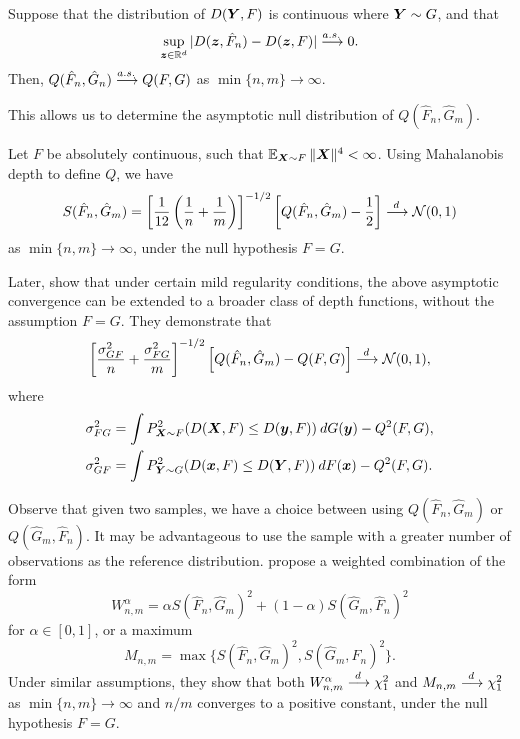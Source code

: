 \begin{theorem}
    Suppose that the distribution of $D(\bm{Y}, F)$ is continuous where $\bm{Y} \sim
    G$, and that
    \begin{equation}
        \sup_{\bm{z} \in \mathbb{R}^d} |D(\bm{z}, \hat{F}_n) - D(\bm{z}, F)| \overset{a.s.\,}{\longrightarrow} 0.
    \end{equation}
    Then, $Q(\hat{F}_n, \hat{G}_n) \overset{a.s.\,}{\longrightarrow} Q(F, G)$ as $\min\{n, m\} \to
    \infty$.
\end{theorem}

This allows us to determine the asymptotic null distribution of $Q(\hat{F}_n,
\hat{G}_m)$.

\begin{theorem}
    Let $F$ be absolutely continuous, such that $\operatorname{\mathbb{E}}_{\bm{X} \sim F} \Vert \bm{X} \Vert^4
    < \infty$.
    Using Mahalanobis depth to define $Q$, we have
    \begin{equation}
        S(\hat{F}_n, \hat{G}_m) = \left[\frac{1}{12}\left(\frac{1}{n} + \frac{1}{m}\right)\right]^{-1/2} \left[Q(\hat{F}_n, \hat{G}_m) - \frac{1}{2}\right] \overset{d\,}{\longrightarrow} \mathcal{N}(0, 1)
    \end{equation}
    as $\min\{n, m\} \to \infty$, under the null hypothesis $F = G$.
\end{theorem}

Later, \textcite{zuo-he-2006} show that under certain mild regularity
conditions, the above asymptotic convergence can be extended to a broader
class of depth functions, without the assumption $F = G$.
They demonstrate that
\begin{equation}
    \left[\frac{\sigma_{GF}^2}{n} + \frac{\sigma_{FG}^2}{m}\right]^{-1/2} \left[Q(\hat{F}_n, \hat{G}_m) - Q(F, G)\right] \overset{d\,}{\longrightarrow} \mathcal{N}(0, 1),
\end{equation}
where
\begin{align}
    \sigma_{FG}^2 &= \int P^2_{\bm{X} \sim F}(D(\bm{X}, F) \leq D(\bm{y}, F)) \:dG(\bm{y}) - Q^2(F, G), \\
    \sigma_{GF}^2 &= \int P^2_{\bm{Y} \sim G}(D(\bm{x}, F) \leq D(\bm{Y}, F)) \:dF(\bm{x}) - Q^2(F, G).
\end{align}

Observe that given two samples, we have a choice between using $Q(\hat{F}_n,
\hat{G}_m)$ or $Q(\hat{G}_m, \hat{F}_n)$.
It may be advantageous to use the sample with a greater number of observations
as the reference distribution.
\textcite{shi-zhang-fu-2023} propose a weighted combination of the form
\begin{equation}
    W^\alpha_{n, m} = \alpha S(\hat{F}_n, \hat{G}_m)^2 + (1 - \alpha) S(\hat{G}_m, \hat{F}_n)^2
\end{equation}
for $\alpha \in [0, 1]$, or a maximum
\begin{equation}
    M_{n, m} = \max\{S(\hat{F}_n, \hat{G}_m)^2, S(\hat{G}_m, \hat{F}_n)^2\}.
\end{equation}
Under similar assumptions, they show that both $W^\alpha_{n, m} \overset{d\,}{\longrightarrow} \chi^2_1$
and $M_{n, m} \overset{d\,}{\longrightarrow} \chi^2_1$ as $\min\{n, m\} \to \infty$ and $n / m$
converges to a positive constant, under the null hypothesis $F = G$.
